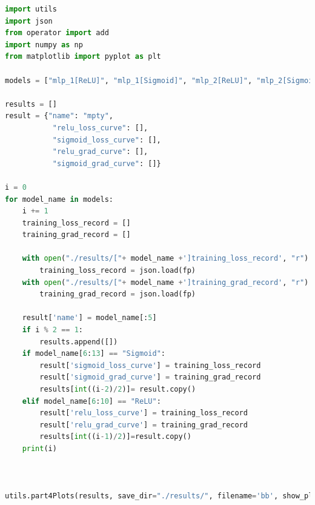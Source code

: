 \documentclass[3p,times,procedia]{elsarticle}
\begin{document}
\begin{lstlisting}[language=Python]
    import utils
import json
from operator import add
import numpy as np
from matplotlib import pyplot as plt

models = ["mlp_1[ReLU]", "mlp_1[Sigmoid]", "mlp_2[ReLU]", "mlp_2[Sigmoid]", "cnn_3[ReLU]", "cnn_3[Sigmoid]", "cnn_4[ReLU]", "cnn_4[Sigmoid]", "cnn_5[ReLU]", "cnn_5[Sigmoid]"]

results = []
result = {"name": "mpty",
           "relu_loss_curve": [],
           "sigmoid_loss_curve": [],
           "relu_grad_curve": [],
           "sigmoid_grad_curve": []}

i = 0 
for model_name in models:
    i += 1
    training_loss_record = []
    training_grad_record = []

    with open("./results/["+ model_name +']training_loss_record', "r") as fp:
        training_loss_record = json.load(fp)
    with open("./results/["+ model_name +']training_grad_record', "r") as fp:
        training_grad_record = json.load(fp)

    result['name'] = model_name[:5]
    if i % 2 == 1:
        results.append([])
    if model_name[6:13] == "Sigmoid":
        result['sigmoid_loss_curve'] = training_loss_record
        result['sigmoid_grad_curve'] = training_grad_record
        results[int((i-2)/2)]= result.copy()
    elif model_name[6:10] == "ReLU":
        result['relu_loss_curve'] = training_loss_record
        result['relu_grad_curve'] = training_grad_record
        results[int((i-1)/2)]=result.copy()
    print(i)

    

utils.part4Plots(results, save_dir="./results/", filename='bb', show_plot=True)

\end{lstlisting}
\end{document}
